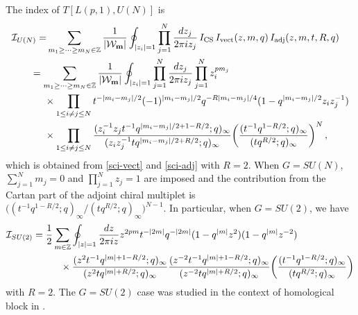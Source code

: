 \documentclass[11pt,hyper,a4paper]{article}
\begin{document}
\vspace{-5mm}


The index of $T[L(p,1), U(N)]$ is 
\begin{align}
\begin{split}
\mathcal{I}_{U(N)} = &\sum_{m_1 \geq \cdots \geq m_N \in \mathbb{Z}} \frac{1}{|\mathcal{W}_{\mathbf{m}}|} \oint_{|z_i|=1} \prod_{j=1}^N \frac{d z_j}{2 \pi i z_j} \,
I_{\text{CS}} \, I_{\text{vect}}(z,m,q) \, I_{\text{adj}}(z,m,t,R,q)
\end{split}	\\
\begin{split}
&=\sum_{m_1 \geq \cdots \geq m_N \in \mathbb{Z}} \frac{1}{|\mathcal{W}_{\mathbf{m}}|} \oint_{|z_i|=1} \prod_{j=1}^N \frac{d z_j}{2 \pi i z_j}
\prod_{j=1}^N z_i^{pm_j} 		\\
&\hspace{5mm} \times \prod_{1 \leq i \neq j \leq N} t^{-|m_i-m_j|/2} (-1)^{|m_i-m_j|/2} q^{-R |m_i-m_j|/4} ( 1 - q^{|m_i - m_j |/2} z_i z_j^{-1} ) 	\\
&\hspace{5mm} \times \prod_{1 \leq i \neq j \leq N} \frac{(z_i^{-1} z_j t^{-1} q^{|m_i-m_j|/2+1-R/2};q)_\infty}{(z_i z_j^{-1} t q^{|m_i-m_j|/2+R/2};q)_\infty}
\bigg( \frac{(t^{-1}q^{1-R/2};q)_\infty}{(t q^{R/2};q)_\infty} \bigg)^N	\,	,
\end{split}
\end{align}
which is obtained from \eqref{sci-vect} and \eqref{sci-adj} with $R=2$.
When $G=SU(N)$, $\sum_{j=1}^N m_j=0$ and $\prod_{j=1}^N z_j=1$ are imposed and the contribution from the Cartan part of the adjoint chiral multiplet is $\big( (t^{-1}q^{1-R/2};q)_\infty / (t q^{R/2};q)_\infty \big)^{N-1}$.
In particular, when $G=SU(2)$, we have 
\begin{align}
\begin{split}
\mathcal{I}_{SU(2)} &= \frac{1}{2} \sum_{m \in \mathbb{Z}}\oint_{|z|=1} \frac{dz}{2 \pi i z} z^{2pm} 
t^{-|2m|} q^{-|2m|} ( 1 - q^{|m|} z^2 ) ( 1 - q^{|m|} z^{-2} ) 	\\	
&\hspace{10mm} \times \frac{(z^2 t^{-1} q^{|m|+1-R/2};q)_\infty}{(z^2 t q^{|m|+R/2};q)_\infty} \frac{(z^{-2} t^{-1} q^{|m|+1-R/2};q)_\infty}{(z^{-2} t q^{|m|+R/2};q)_\infty}
\bigg( \frac{(t^{-1}q^{1-R/2};q)_\infty}{(t q^{R/2};q)_\infty} \bigg)	\label{lens-sci-su2}
\end{split}
\end{align}
with $R=2$.
The $G=SU(2)$ case was studied in the context of homological block in \cite{Gukov-Pei-Putrov-Vafa}.
\end{document}
